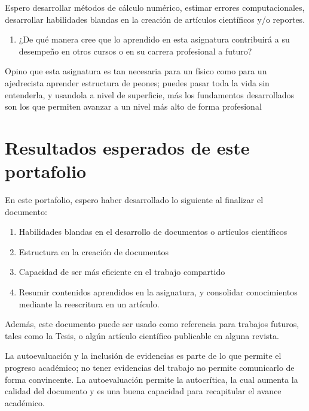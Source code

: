 Espero desarrollar métodos de cálculo numérico, estimar errores computacionales, desarrollar habilidades blandas en la creación de artículos científicos y/o reportes.
\begin{enumerate}[start=4, label={\bfseries \arabic*})]
\item ¿De qué manera cree que lo aprendido en esta asignatura contribuirá a su desempeño en otros cursos o en su carrera profesional a futuro?
\end{enumerate}

Opino que esta asignatura es tan necesaria para un físico como para un ajedrecista aprender estructura de peones; puedes pasar toda la vida sin entenderla, y usandola a nivel de superficie, más los fundamentos desarrollados son los que permiten avanzar a un nivel más alto de forma profesional


\section*{Resultados esperados de este portafolio}
En este portafolio, espero haber desarrollado lo siguiente al finalizar el documento:
\begin{enumerate}[start=1, label={\bfseries \arabic*})]
\item Habilidades blandas en el desarrollo de documentos o artículos científicos
\item Estructura en la creación de documentos
\item Capacidad de ser más eficiente en el trabajo compartido
\item Resumir contenidos aprendidos en la asignatura, y consolidar conocimientos mediante la reescritura en un artículo.
\end{enumerate}

Además, este documento puede ser usado como referencia para trabajos futuros, tales como la Tesis, o algún artículo científico publicable en alguna revista.

La autoevaluación y la inclusión de evidencias es parte de lo que permite el progreso académico; no tener evidencias del trabajo no permite comunicarlo de forma convincente. 
La autoevaluación permite la autocrítica, la cual aumenta la calidad del documento y es una buena capacidad para recapitular el avance académico.



